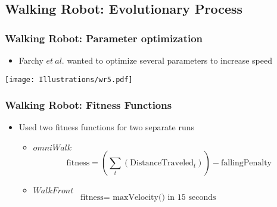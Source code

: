 \documentclass{beamer}
\begin{document}
\begin{frame}


\subsection*{Walking Robot: Evolutionary Process}
\begin{frame}
  \frametitle{Walking Robot: Parameter optimization}
\begin{itemize}
\item Farchy $et~al.$ wanted to optimize several parameters to increase speed
\end{itemize}
\begin{center}
 \texttt{[image: Illustrations/wr5.pdf]}
       \\
\end{center}
\end{frame}

\begin{frame}[fragile]
  \frametitle{Walking Robot: Fitness Functions}
\begin{itemize}
\item Used two fitness functions for two separate runs
\begin{itemize}
\item $omniWalk$ 
\[
  \textrm{fitness} = (\sum_{t} (\textrm{DistanceTraveled}_t)) - \textrm{fallingPenalty}
\]
\item $WalkFront$
\[
  \textrm{fitness} = \textrm{ maxVelocity() in 15 seconds} \qquad\qquad\quad
\]
\end{itemize}
\end{itemize}


\end{frame}
\end{frame}
\end{document}
